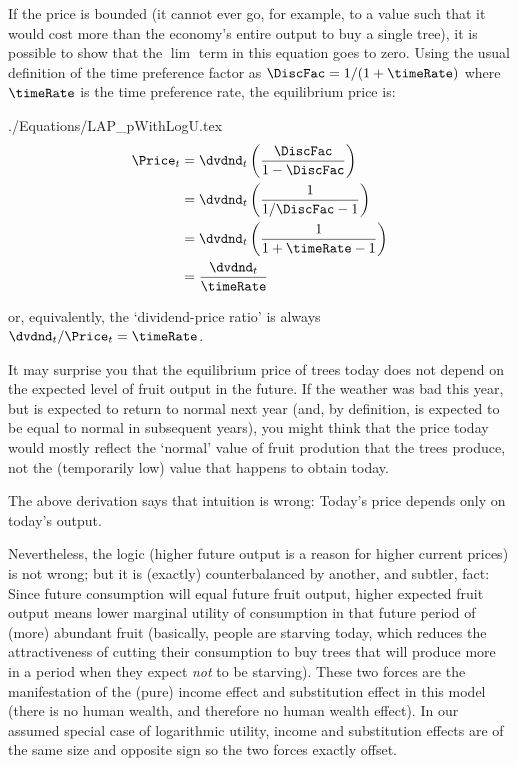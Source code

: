 \documentclass{\handout}
\begin{document}
If the price is bounded (it cannot ever go, for 
example, to a value such that it would cost more than the economy's 
entire output to buy a single tree), it is possible to show that the $\lim$ term 
in this equation goes to zero.  Using the usual definition of the time preference factor
as $\DiscFac = 1/(1+\timeRate)$ where $\timeRate$ is the time preference rate, the equilibrium price is:
\begin{verbatimwrite}{./Equations/LAP_pWithLogU.tex}
\begin{equation}\begin{gathered}\begin{aligned}
 \Price_{t} & =  \dvdnd_{t}\left(\frac{\DiscFac}{1-\DiscFac} \right) \notag 
\\  & =  \dvdnd_{t}\left(\frac{1}{1/\DiscFac-1} \right) \notag 
\\  & =  \dvdnd_{t}\left(\frac{1}{1+\timeRate-1} \right) \notag
\\  & =  \frac{\dvdnd_{t}}{\timeRate} \label{eq:pWithLogU}
\end{aligned}\end{gathered}\end{equation}
\end{verbatimwrite}

or, equivalently, the `dividend-price ratio' is always $\dvdnd_{t}/\Price_{t} = \timeRate$.

It may surprise you that the equilibrium price of trees today does not depend on the expected level of fruit output in the future.  If the weather was bad this year, but is expected to return to normal next year (and, by definition, is expected to be equal to normal in subsequent years), you might think that the price today would mostly reflect the `normal' value of fruit prodution that the trees produce, not the (temporarily low) value that happens to obtain today.

The above derivation says that intuition is wrong: Today's price depends only on today's output.

Nevertheless, the logic (higher future output is a reason for higher current prices) is not wrong; but it is (exactly) counterbalanced by another, and subtler, fact: Since future consumption will equal future fruit output, higher expected fruit output means lower marginal utility of consumption in that future period of (more) abundant fruit (basically, people are starving today, which reduces the attractiveness of cutting their consumption to buy trees that will produce more in a period when they expect \textit{not} to be starving).  These two forces are the manifestation of the (pure) income effect and substitution effect in this model (there is no human wealth, and therefore no human wealth effect).  In our assumed special case of logarithmic utility, income and substitution effects are of the same size and opposite sign so the two forces exactly offset.
\end{document}
